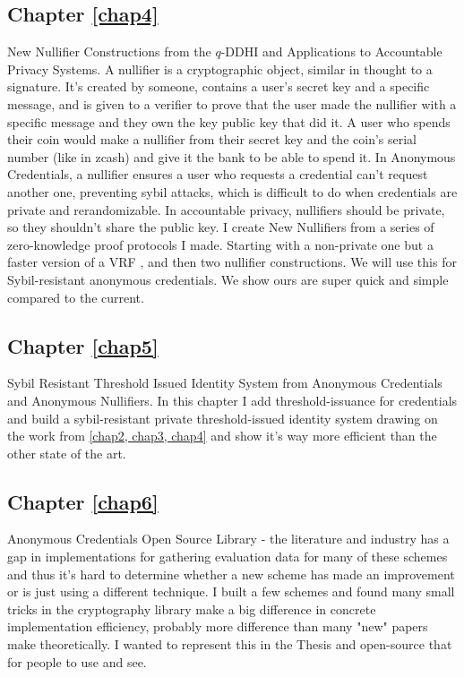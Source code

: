 \subsection{Chapter \ref{chap4}}
New Nullifier Constructions from the $q$-DDHI and Applications to Accountable Privacy Systems. A nullifier is a cryptographic object, similar in thought to a signature. It's created by someone, contains a user's secret key and a specific message, and is given to a verifier to prove that the user made the nullifier with a specific message and they own the key public key that did it. A user who spends their coin would make a nullifier from their secret key and the coin's serial number (like in zcash) and give it the bank to be able to spend it. In Anonymous Credentials, a nullifier ensures a user who requests a credential can't request another one, preventing sybil attacks, which is difficult to do when credentials are private and rerandomizable.
In accountable privacy, nullifiers should be private, so they shouldn't share the public key. 
I create New Nullifiers from a series of zero-knowledge proof protocols I made. Starting with a non-private one but a faster version of a VRF \cite{hutchison_verifiable_2005}, and then two nullifier constructions. We will use this for Sybil-resistant anonymous credentials. We show ours are super quick and simple compared to the current.

\subsection{Chapter \ref{chap5}}
Sybil Resistant Threshold Issued Identity System from Anonymous Credentials and Anonymous Nullifiers. In this chapter I add threshold-issuance for credentials and build a sybil-resistant private threshold-issued identity system drawing on the work from \ref{chap2, chap3, chap4} and show it's way more efficient than the other state of the art.

\subsection{Chapter \ref{chap6}}
Anonymous Credentials Open Source Library - the literature and industry has a gap in implementations for gathering evaluation data for many of these schemes and thus it's hard to determine whether a new scheme has made an improvement or is just using a different technique. I built a few schemes and found many small tricks in the cryptography library make a big difference in concrete implementation efficiency, probably more difference than many "new" papers make theoretically. I wanted to represent this in the Thesis and open-source that for people to use and see.

